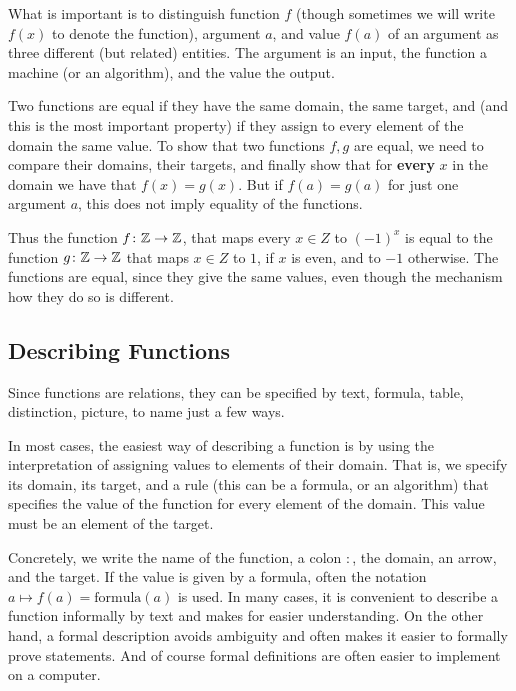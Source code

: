 What is important is to distinguish function $f$ (though sometimes we will write $f(x)$
to denote the function), argument $a$, and value
$f(a)$ of an
argument as three different (but related) entities. The argument is an
input, the function a machine (or an algorithm), and the value the output.
\smallskip

Two functions are equal if they have the same domain, the same target, and
(and this is the most important property)
if they assign to every element of the domain the same value.
To show that two functions $f,g$ are equal, we need to compare their
domains, their targets, and finally show that for \textbf{every} $x$ in the
domain we have that $f(x)=g(x)$.
But if $f(a)=g(a)$ for just one argument $a$, this does not imply equality
of the functions.

Thus the function $f\colon{\mathbb Z}\to{\mathbb Z}$, that maps every $x\in Z$ to $(-1)^x$ is
equal to the function $g\colon{\mathbb Z}\to{\mathbb Z}$ that maps $x\in Z$ to $1$, if $x$ is
even, and to $-1$ otherwise. The functions are equal, since they give the
same values, even though the mechanism how they do so is different.

\subsection{Describing Functions}
Since functions are relations, they can be specified by
text, formula, table, distinction, picture,
to name just a few ways.

In most cases, the easiest way of describing a function is by
using the interpretation of assigning values to elements of
their domain. That is, we specify
its domain, its target, and a rule (this can be a formula, or an algorithm)
that specifies the value of the
function for every element of the domain. This value must be an element of
the target.

Concretely, we write the name of the
function, a colon $\colon$, the domain, an arrow, and the target. If the
value is given by a formula, often the notation $a\mapsto f(a)=\mbox{formula}(a)$
is used. In many cases, it is convenient to describe a function informally
by text and makes for easier understanding. On the other hand, a formal
description avoids ambiguity and often makes it easier to formally prove
statements. And of course formal definitions are often easier to implement on a
computer.


